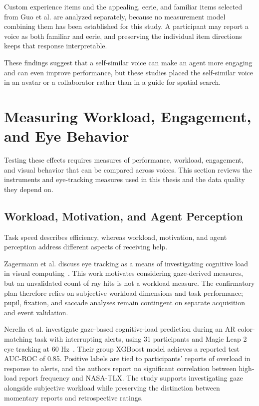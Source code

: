 Custom experience items and the appealing, eerie, and familiar items selected from Guo et al. are analyzed separately, because no measurement model combining them has been established for this study. A participant may report a voice as both familiar and eerie, and preserving the individual item directions keeps that response interpretable.

These findings suggest that a self-similar voice can make an agent more engaging and can even improve performance, but these studies placed the self-similar voice in an avatar or a collaborator rather than in a guide for spatial search.

\section{Measuring Workload, Engagement, and Eye Behavior}
Testing these effects requires measures of performance, workload, engagement, and visual behavior that can be compared across voices. This section reviews the instruments and eye-tracking measures used in this thesis and the data quality they depend on.

\subsection{Workload, Motivation, and Agent Perception}
Task speed describes efficiency, whereas workload, motivation, and agent perception address different aspects of receiving help.

Zagermann et al. discuss eye tracking as a means of investigating cognitive load in visual computing~\cite{zagermann2016workload}. This work motivates considering gaze-derived measures, but an unvalidated count of ray hits is not a workload measure. The confirmatory plan therefore relies on subjective workload dimensions and task performance; pupil, fixation, and saccade analyses remain contingent on separate acquisition and event validation.

Nerella et al. investigate gaze-based cognitive-load prediction during an AR color-matching task with interrupting alerts, using 31 participants and Magic Leap 2 eye tracking at 60 Hz~\cite{nerella2026gaze}. Their group XGBoost model achieves a reported test AUC-ROC of 0.85. Positive labels are tied to participants' reports of overload in response to alerts, and the authors report no significant correlation between high-load report frequency and NASA-TLX. The study supports investigating gaze alongside subjective workload while preserving the distinction between momentary reports and retrospective ratings.

